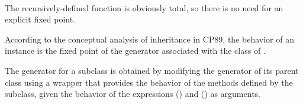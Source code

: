 \begin{AgdaAlign}
\begin{code}
\>[22]\AgdaSpace{}%
\AgdaSpace{}%
\AgdaSpace{}%
\AgdaSymbol{=}\<%
\\
\>[2][@{}l@{\AgdaIndent{0}}]%
\>[4]\AgdaSpace{}%
\AgdaSpace{}%
\AgdaSpace{}%
\AgdaSpace{}%
\AgdaSpace{}%
\AgdaSpace{}%
\AgdaSpace{}%
\AgdaSymbol{(}\AgdaSpace{}%
\AgdaSymbol{(}\AgdaSpace{}%
\AgdaSpace{}%
\AgdaSpace{}%
\AgdaSpace{}%
\AgdaSymbol{)}\AgdaSpace{}%
\AgdaSymbol{)}\<%
\end{code}
%
The recursively-defined function  is obviously total,
so there is no need for an explicit fixed point.

According to the conceptual analysis of inheritance in CP89,
the behavior of an instance  is the fixed point
of the generator associated with the class of .

The generator for a subclass is obtained by modifying the generator of its parent class
using a wrapper that provides the behavior of the methods defined by the subclass,
given the behavior of the expressions  ()
and  () as arguments.


\end{AgdaAlign}
